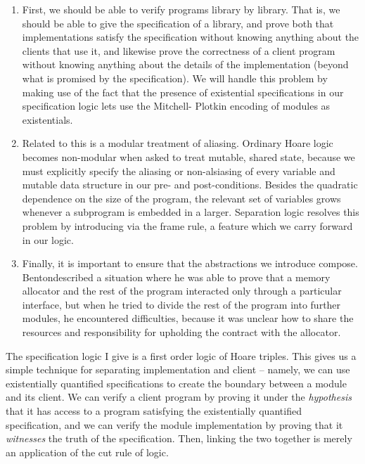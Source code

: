 \begin{enumerate}
\item First, we should be able to verify programs library by
  library. That is, we should be able to give the specification of a
  library, and prove both that implementations satisfy the
  specification without knowing anything about the clients that
  use it, and likewise prove the correctness of a client program
  without knowing anything about the details of the implementation
  (beyond what is promised by the specification). We will handle this
  problem by making use of the fact that the presence of existential
  specifications in our specification logic lets  use the Mitchell-
  Plotkin encoding of modules as existentials. 

\item Related to this is a modular treatment of aliasing. Ordinary
  Hoare logic becomes non-modular when asked to treat mutable, shared
  state, because we must explicitly specify the aliasing or
  non-alsiasing of every variable and mutable data structure in our
  pre- and post-conditions. Besides the quadratic dependence on the
  size of the program, the relevant set of variables grows whenever 
  a subprogram is embedded in a larger. Separation logic resolves this
  problem by introducing via the frame rule, a feature which we carry
  forward in our logic. 

\item Finally, it is important to ensure that the abstractions we
  introduce compose. Benton\cite{benton-modularity}described a
  situation where he was able to prove that a memory allocator and the
  rest of the program interacted only through a particular interface,
  but when he tried to divide the rest of the program into further
  modules, he encountered difficulties, because it was unclear how to
  share the resources and responsibility for upholding the contract
  with the allocator. 


\end{enumerate}


The specification logic I give is a first order logic of Hoare
triples. This gives us a simple technique for separating
implementation and client -- namely, we can use existentially
quantified specifications to create the boundary between a module and
its client. We can verify a client program by proving it under the
\emph{hypothesis} that it has access to a program satisfying the
existentially quantified specification, and we can verify the module
implementation by proving that it \emph{witnesses} the truth of the
specification. Then, linking the two together is merely an application
of the cut rule of logic.

